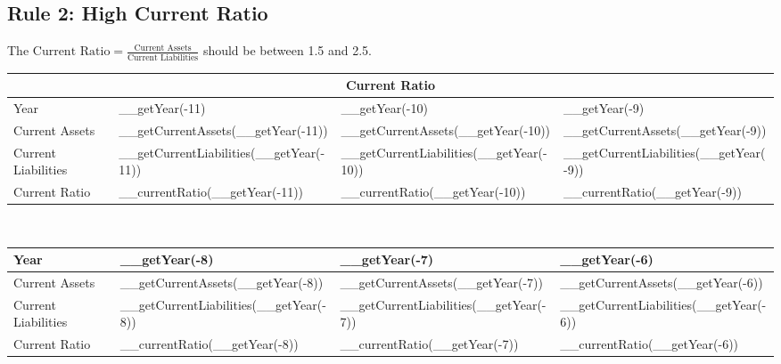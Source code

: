 \subsection{Rule 2: High Current Ratio}
The $\text{Current Ratio} = \frac{\text{Current Assets}}{\text{Current Liabilities}}$
should be between 1.5 and 2.5.\\

\begin{tabularx}{\textwidth}{|X|X|X|X|}
 \hline
 \multicolumn{4}{|c|}{Current Ratio} \\
 \hline
 Year                               & __getYear(-11)                          & __getYear(-10)                          & __getYear(-9)                          \\
 \hline
 Current Assets                     & __getCurrentAssets(__getYear(-11))      & __getCurrentAssets(__getYear(-10))      & __getCurrentAssets(__getYear(-9))      \\
 Current Liabilities                & __getCurrentLiabilities(__getYear(-11)) & __getCurrentLiabilities(__getYear(-10)) & __getCurrentLiabilities(__getYear(-9)) \\
 \rowcolor{lightgray} Current Ratio & __currentRatio(__getYear(-11))          & __currentRatio(__getYear(-10))          & __currentRatio(__getYear(-9))          \\
 \hline
\end{tabularx}\\

\begin{tabularx}{\textwidth}{|X|X|X|X|}
 \hline
 Year                               & __getYear(-8)                          & __getYear(-7)                          & __getYear(-6)                          \\
 \hline
 Current Assets                     & __getCurrentAssets(__getYear(-8))      & __getCurrentAssets(__getYear(-7))      & __getCurrentAssets(__getYear(-6))      \\
 Current Liabilities                & __getCurrentLiabilities(__getYear(-8)) & __getCurrentLiabilities(__getYear(-7)) & __getCurrentLiabilities(__getYear(-6)) \\
 \rowcolor{lightgray} Current Ratio & __currentRatio(__getYear(-8))          & __currentRatio(__getYear(-7))          & __currentRatio(__getYear(-6))          \\
 \hline
\end{tabularx}\\

